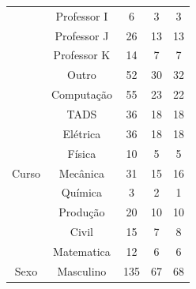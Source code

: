 \begin{table}[h]
\begin{tabular}{|c|c|c|c|c|}
                                        & Professor I      & 6                                   & 3                    & 3                                \\
                                        & Professor J      & 26                                  & 13                   & 13                               \\
                                        & Professor K      & 14                                  & 7                    & 7                                \\
                                        & Outro            & 52                                  & 30                   & 32                               \\ \hline
  \multirow{9}{*}{Curso}                & Computação       & 55                                  & 23                   & 22                               \\
                                        & TADS             & 36                                  & 18                   & 18                               \\
                                        & Elétrica         & 36                                  & 18                   & 18                               \\
                                        & Física           & 10                                  & 5                    & 5                                \\
                                        & Mecânica         & 31                                  & 15                   & 16                               \\
                                        & Química          & 3                                   & 2                    & 1                                \\
                                        & Produção         & 20                                  & 10                   & 10                               \\
                                        & Civil            & 15                                  & 7                    & 8                                \\
                                        & Matematica       & 12                                  & 6                    & 6                                \\ \hline
  \multirow{3}{*}{Sexo}                 & Masculino        & 135                                 & 67                   & 68                               \\

\end{tabular}
\end{table}
